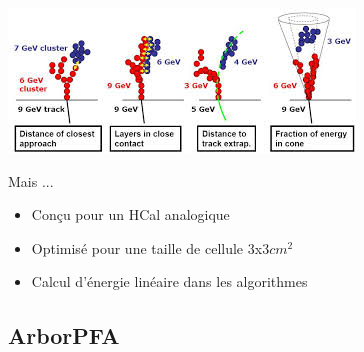 \documentclass[8pt]{beamer}
\begin{document}
\begin{frame}
\begin{minipage}{0.6\linewidth}
      \includegraphics[width=0.9\linewidth]{pandorapfa_associations.jpg}      
    \end{minipage}\pause
    \begin{block}{Mais ...}
      \begin{itemize}
        \item Conçu pour un HCal analogique
        \item Optimisé pour une taille de cellule 3x3$cm^2$
        \item Calcul d'énergie linéaire dans les algorithmes 
      \end{itemize}
    \end{block}
  \end{frame}
  
  \subsection{ArborPFA}
\end{document}
